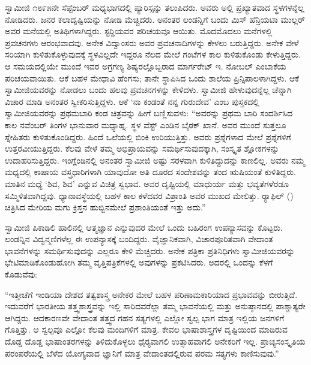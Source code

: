  ಸ್ವಾಮೀಜಿ ೧೮೯೫ನೇ ಸೆಪ್ಟೆಂಬರ್ ಮಧ್ಯಭಾಗದಲ್ಲಿ ಪ್ಯಾರಿಸ್ಸನ್ನು ತಲುಪಿದರು. ಅವರು ಅಲ್ಲಿ ಪ್ರಖ್ಯಾತವಾದ ಸ್ಥಳಗಳನ್ನೆಲ್ಲ ನೋಡಿದರು. ಜನರ ಕಲಾದೃಷ್ಟಿಯನ್ನು ನೋಡಿ ಮೆಚ್ಚಿದರು. ಅನಂತರ ಲಂಡನ್ನಿಗೆ ಬಂದು ಮಿಸ್ ಹೆನ್ರಿಯಟಾ ಮುಲ್ಲರ್ ಅವರ ಮನೆಯಲ್ಲಿ ಅತಿಥಿಗಳಾಗಿದ್ದರು. ಸ್ಟರ‍್ಡಿಯವರ ಪರಿಚಯವೂ ಆಯಿತು. ಮೊದಮೊದಲು ಮನೆಗಳಲ್ಲಿ ಪ್ರವಚನಗಳು ಆರಂಭವಾದವು. ಅನೇಕ ವಿದ್ವಾಂಸರು ಅವರ ಪ್ರವಚನಾದಿಗಳನ್ನು ಕೇಳಲು ಬರುತ್ತಿದ್ದರು. ಅನೇಕ ವೇಳೆ ಸರಿಯಾಗಿ ಕುಳಿತುಕೊಳ್ಳುವುದಕ್ಕೆ ಸ್ಥಳವಿಲ್ಲದೇ ಇದ್ದರೂ ನೆಲದ ಮೇಲೆ ಗಂಟೆಗಳ ಕಾಲ ಕುಳಿತುಕೊಂಡು ಕೇಳುತ್ತಿದ್ದರು. ಆ ಸಮಯದಲ್ಲಿಯೇ ಮುಂದೆ ಇವರ ಅಗ್ರಗಣ್ಯ ಶಿಷ್ಯರಲ್ಲೊಬ್ಬರಾದ ಮಾರ್ಗರೇಟ್ ಇ. ನೋಬಲ್ ಎಂಬಾಕೆಯ ಪರಿಚಯವಾಯಿತು. ಆಕೆ ಬಹಳ ಮೇಧಾವಿ ಹೆಂಗಸು; ತಾನೇ ಸ್ಥಾಪಿಸಿದ ಒಂದು ಶಾಲೆಯ ಪ್ರಿನ್ಸಿಪಾಲಳಾಗಿದ್ದಳು. ಆಕೆ ಸ್ವಾಮೀಜಿಯವರನ್ನು ನೋಡಲು ಬಂದು ಹಲವು ಪ್ರವಚನಗಳನ್ನು ಕೇಳಿದಳು. ಸ್ವಾಮೀಜಿ ಹೇಳುವುದನ್ನೆಲ್ಲ ಚೆನ್ನಾಗಿ ವಿಚಾರ ಮಾಡಿ ಅನಂತರ ಸ್ವೀಕರಿಸುತ್ತಿದ್ದಳು. ಆಕೆ ‘ನಾ ಕಂಡಂತೆ ನನ್ನ ಗುರುದೇವ’ ಎಂಬ ಪುಸ್ತಕದಲ್ಲಿ ಸ್ವಾಮೀಜಿಯವರನ್ನು ಪ್ರಥಮಬಾರಿ ಕಂಡ ಚಿತ್ರವನ್ನು ಹೀಗೆ ಬಣ್ಣಿಸುವಳು: “ಅವರನ್ನು ಪ್ರಥಮ ಬಾರಿ ಸಂದರ್ಶಿಸಿದ ಕಾಲ ನವೆಂಬರ್ ತಿಂಗಳ ಭಾನುವಾರ ಮಧ್ಯಾಹ್ನ. ಸ್ಥಳ ವೆಸ್ಟ್ ಎಂಡಿನ ಬೈಠಕ್ ಖಾನೆ. ಅವರ ಮುಂದೆ ಸುತ್ತಲೂ ಸ್ನೇಹಿತರು ಕುಳಿತುಕೊಂಡಿದ್ದರು. ಹಿಂದೆ ಒಲೆಯಲ್ಲಿ ಬಿಂಕಿ ಉರಿಯುತ್ತಿತ್ತು. ಅವರು ಪ್ರಶ್ನೆಗಳಾದ ಮೇಲೆ ಪ್ರಶ್ನೆಗಳಿಗೆ ಉತ್ತರವೀಯುತ್ತಿದ್ದರು. ಕೆಲವು ವೇಳೆ ತಮ್ಮ ಅಭಿಪ್ರಾಯವನ್ನು ಸಮರ್ಥಿಸುವುದಕ್ಕಾಗಿ, ಸಂಸ್ಕೃತ ಶ್ಲೋಕಗಳನ್ನು ಉದಾಹರಿಸುತ್ತಿದ್ದರು. ಇಂಗ್ಲೆಂಡಿನಲ್ಲಿ ಅನಂತರ ಸ್ವಾಮೀಜಿ ಅಷ್ಟು ಸರಳವಾಗಿ ಕುಳಿತಿದ್ದುದನ್ನು ಕಾಣಲಿಲ್ಲ. ಅವರು ನಮ್ಮ ಮಧ್ಯದಲ್ಲಿ ಕಾಷಾಯ ವಸ್ತ್ರಧಾರಿಗಳಾಗಿ ಯಾವುದೋ ಅತಿ ದೂರದ ಸಂದೇಶವನ್ನು ತಂದ ಋಷಿಯಂತೆ ಕುಳಿತಿದ್ದರು. ಮಾತಿನ ಮಧ್ಯೆ ‘ಶಿವ, ಶಿವ’ ಎನ್ನುವ ವಿಚಿತ್ರ ಸ್ವಭಾವ. ಅವರ ದೃಷ್ಟಿಯಲ್ಲಿ ಮಾಧುರ್ಯ ಮತ್ತು ಭವ್ಯತೆಗಳೆರಡೂ ಸಮ್ಮಿಳಿತವಾಗಿದ್ದವು. ಧ್ಯಾನಾವಸ್ಥೆಯಲ್ಲಿ ಬಹಳ ಕಾಲ ಕಳೆದವರ ವಿಶ್ರಾಂತಿ ಅವರ ಮುಖದ ಮೇಲಿತ್ತು. ರ‍್ಯಾಫಿಲ್ () ಚಿತ್ರಿಸಿದ ಮೇರಿಯ ಮಗು ಕ್ರಿಸ್ತನ ಹುಬ್ಬಿನಮೇಲೆ ಪ್ರಶಾಂತಿಯಂತೆ ಇತ್ತು ಅದು.” 

 ಸ್ವಾಮೀಜಿ ಪಿಕಾಡಿಲಿ ಹಾಲಿನಲ್ಲಿ ಆತ್ಮಜ್ಞಾನ ಎನ್ನುವುದರ ಮೇಲೆ ಒಂದು ಬಹಿರಂಗ ಉಪನ್ಯಾಸವನ್ನು ಕೊಟ್ಟರು. ಲಂಡನ್ನಿನ ವಿದ್ವನ್ಮಣಿಗಳೆಲ್ಲ ಈ ಉಪನ್ಯಾಸಕ್ಕೆ ಬಂದಿದ್ದರು. ವೈಜ್ಞಾನಿಕವಾಗಿ, ವಿಚಾರಪೂರಿತವಾಗಿ ವೇದಾಂತ ಭಾವನೆಗಳನ್ನು ಸಮರ್ಥಿಸುವುದನ್ನು ಎಲ್ಲರೂ ಕೇಳಿ ಮೆಚ್ಚಿದರು. ಅನೇಕ ಪತ್ರಿಕಾ ಪ್ರತಿನಿಧಿಗಳು ಸ್ವಾಮೀಜಿಯವರನ್ನು ಭೇಟಿಮಾಡಿಕೊಂಡುಹೋಗಿ ತಮ್ಮ ವೃತ್ತಿಪತ್ರಿಕೆಗಳಲ್ಲಿ ಅವುಗಳನ್ನು ಪ್ರಕಟಿಸಿದರು. ಅದರಲ್ಲಿ ಒಂದನ್ನು ಕೆಳಗೆ ಕೊಡುವೆವು: 

  “ಇತ್ತೀಚೆಗೆ ಇಂಡಿಯಾ ದೇಶದ ತತ್ವಶಾಸ್ತ್ರ ಅನೇಕರ ಮೇಲೆ ಬಹಳ ಪರಿಣಾಮಕಾರಿಯಾದ ಪ್ರಭಾವವನ್ನು ಬೀರುತ್ತಿದೆ. ಇದುವರೆಗೆ ಭಾರತೀಯ ತತ್ತ್ವಶಾಸ್ತ್ರವನ್ನು ಇಲ್ಲಿ ಸಾರಿದವರೆಲ್ಲಾ ತಮ್ಮ ಭಾವನೆಯಲ್ಲಿ ಮತ್ತು ಅನುಷ್ಠಾನದಲ್ಲಿ ಪಾಶ್ಚಾತ್ಯರೇ ಆಗಿದ್ದರು. ಆದಕಾರಣವೇ ವೇದಾಂತ ತತ್ತ್ವದ ಗಹನ ಸತ್ಯಗಳಲ್ಲಿ ಎಲ್ಲೋ ಸ್ವಲ್ಪ ಭಾಗ ಮಾತ್ರ ಇಲ್ಲಿಯ ಜನಗಳಿಗೆ ಗೊತ್ತಿತ್ತು. ಆ ಸ್ವಲ್ಪವೂ ಎಲ್ಲೋ ಕೆಲವು ಮಂದಿಗಳಿಗೆ ಮಾತ್ರ. ಕೇವಲ ಭಾಷಾಶಾಸ್ತ್ರಗಳ ದೃಷ್ಟಿಯಿಂದ ಮಾಡಿರುವ ದೊಡ್ಡ ದೊಡ್ಡ ಭಾಷಾಂತರಗಳನ್ನು ತಿಳಿದುಕೊಳ್ಳಲು ಧೈರ‍್ಯವಾಗಲಿ ಉತ್ಸಾಹವಾಗಲಿ ಅನೇಕರಿಗೆ ಇಲ್ಲ. ಪ್ರಾಚ್ಯಸಂಸ್ಕೃತಿಯ ಪರಂಪರೆಯಲ್ಲಿ ಬೆಳೆದ ಯೋಗ್ಯವಾದ ಜ್ಞಾನಿಗೆ ಮಾತ್ರ ವೇದಾಂತದಲ್ಲಿರುವ ಪರಮ ಸತ್ಯಗಳು ಕಾಣಿಸುವುವು.” 

